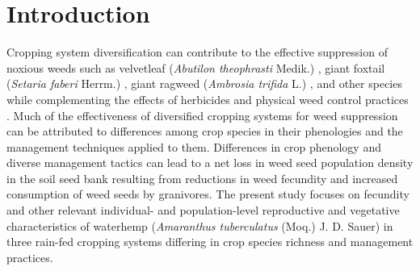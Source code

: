 \documentclass[
]{article}
\begin{document}
\hypertarget{introduction}{%
\section*{Introduction}\label{introduction}}

Cropping system diversification can contribute to the effective suppression of noxious weeds such as velvetleaf (\emph{Abutilon theophrasti} Medik.) \citep{westermanAreManyLittle2005}, giant foxtail (\emph{Setaria faberi} Herrm.) \citep{liebmanFatesSetariaFaberi2014}, giant ragweed (\emph{Ambrosia trifida} L.) \citep{liebmanCroppingSystemRedesign2020}, and other species while complementing the effects of herbicides and physical weed control practices \citep{davisIncreasingCroppingSystem2012, weisbergerDoesDiversifyingCrop2019}.
Much of the effectiveness of diversified cropping systems for weed suppression can be attributed to differences among crop species in their phenologies and the management techniques applied to them. Differences in crop phenology and diverse management tactics can lead to a net loss in weed seed population density in the soil seed bank \citep{maclarenEcologicalFutureWeed2020, liebmanManyLittleHammers1997} resulting from reductions in weed fecundity and increased consumption of weed seeds by granivores. The present study focuses on fecundity and other relevant individual- and population-level reproductive and vegetative characteristics of waterhemp (\emph{Amaranthus tuberculatus} (Moq.) J. D. Sauer) in three rain-fed cropping systems differing in crop species richness and management practices.
\end{document}
